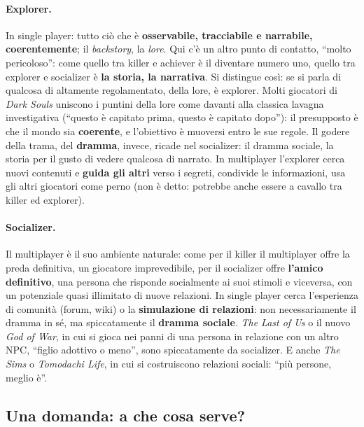 \paragraph{Explorer.} In single player: tutto ciò che è \textbf{osservabile,
tracciabile e narrabile, coerentemente}; il \emph{backstory}, la \emph{lore}. Qui c'è
un altro punto di contatto, ``molto pericoloso'': come quello tra killer e achiever è
il diventare numero uno, quello tra explorer e socializer è \textbf{la storia, la
narrativa}. Si distingue così: se si parla di qualcosa di altamente regolamentato,
della lore, è explorer. Molti giocatori di \emph{Dark Souls} uniscono i puntini della
lore come davanti alla classica lavagna investigativa (``questo è capitato prima,
questo è capitato dopo''): il presupposto è che il mondo sia \textbf{coerente}, e
l'obiettivo è muoversi entro le sue regole. Il godere della trama, del
\textbf{dramma}, invece, ricade nel socializer: il dramma sociale, la storia per il
gusto di vedere qualcosa di narrato. In multiplayer l'explorer cerca nuovi contenuti
e \textbf{guida gli altri} verso i segreti, condivide le informazioni, usa gli altri
giocatori come perno (non è detto: potrebbe anche essere a cavallo tra killer ed
explorer).

\paragraph{Socializer.} Il multiplayer è il suo ambiente naturale: come per il killer
il multiplayer offre la preda definitiva, un giocatore imprevedibile, per il
socializer offre \textbf{l'amico definitivo}, una persona che risponde socialmente
ai suoi stimoli e viceversa, con un potenziale quasi illimitato di nuove relazioni.
In single player cerca l'esperienza di comunità (forum, wiki) o la
\textbf{simulazione di relazioni}: non necessariamente il dramma in sé, ma
spiccatamente il \textbf{dramma sociale}. \emph{The Last of Us} o il nuovo \emph{God
of War}, in cui si gioca nei panni di una persona in relazione con un altro NPC,
``figlio adottivo o meno'', sono spiccatamente da socializer. E anche \emph{The Sims}
o \emph{Tomodachi Life}, in cui si costruiscono relazioni sociali: ``più persone,
meglio è''.

\subsection{Una domanda: a che cosa serve?}


